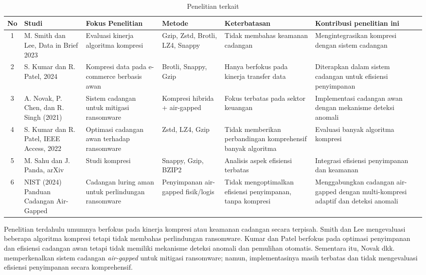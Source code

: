 \documentclass{iaesarticle}
\begin{document}
\begin{table}[H]
\centering
\fontsize{8pt}{10pt}\selectfont
\caption{Penelitian terkait}
\label{tab:related_work}
\begin{tabularx}{\textwidth}{@{}c p{2.2cm} X X X X@{}}
\hline
\textbf{No} & \textbf{Studi} & \textbf{Fokus Penelitian} & \textbf{Metode} & \textbf{Keterbatasan} & \textbf{Kontribusi penelitian ini} \\
\hline
1 & M. Smith dan Lee, Data in Brief 2023 & Evaluasi kinerja algoritma kompresi & Gzip, Zstd, Brotli, LZ4, Snappy & Tidak membahas keamanan cadangan & Mengintegrasikan kompresi dengan sistem cadangan \\
2 & S. Kumar dan R. Patel, 2024 & Kompresi data pada e-commerce berbasis awan & Brotli, Snappy, Gzip & Hanya berfokus pada kinerja transfer data & Diterapkan dalam sistem cadangan untuk efisiensi penyimpanan \\
3 & A. Novak, P. Chen, dan R. Singh (2021) & Sistem cadangan untuk mitigasi ransomware & Kompresi hibrida + air-gapped & Fokus terbatas pada sektor keuangan & Implementasi cadangan awan dengan mekanisme deteksi anomali \\
4 & S. Kumar dan R. Patel, IEEE Access, 2022 & Optimasi cadangan awan terhadap ransomware & Zstd, LZ4, Gzip & Tidak memberikan perbandingan komprehensif banyak algoritma & Evaluasi banyak algoritma kompresi \\
5 & M. Sahu dan J. Panda, arXiv & Studi kompresi & Snappy, Gzip, BZIP2 & Analisis aspek efisiensi terbatas & Integrasi efisiensi penyimpanan dan keamanan \\
6 & NIST (2024) Panduan Cadangan Air-Gapped & Cadangan luring aman untuk perlindungan ransomware & Penyimpanan air-gapped fisik/logis & Tidak mengoptimalkan efisiensi penyimpanan, tanpa kompresi & Menggabungkan cadangan air-gapped dengan multi-kompresi adaptif dan deteksi anomali \\
\hline
\end{tabularx}
\end{table}

Penelitian terdahulu umumnya berfokus pada kinerja kompresi atau keamanan cadangan secara terpisah. Smith dan Lee mengevaluasi beberapa algoritma kompresi tetapi tidak membahas perlindungan ransomware. Kumar dan Patel berfokus pada optimasi penyimpanan dan efisiensi cadangan awan tetapi tidak memiliki mekanisme deteksi anomali dan pemulihan otomatis. Sementara itu, Novak dkk. memperkenalkan sistem cadangan \textit{air-gapped} untuk mitigasi ransomware; namun, implementasinya masih terbatas dan tidak mengevaluasi efisiensi penyimpanan secara komprehensif.
\end{document}
